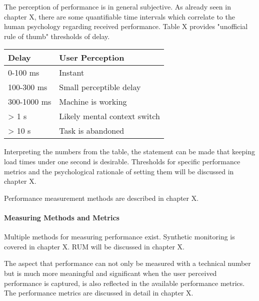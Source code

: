 The perception of performance is in general subjective.
As already seen in chapter X, there are some quantifiable time intervals which correlate to the human psychology regarding received performance.
Table X provides "unofficial rule of thumb" thresholds of delay. %

\begin{table}[h]
	\centering
	\begin{tabular}{| l | l | }
	\hline
	Delay & User Perception \\
	\hline
	0-100 ms & Instant \\
	100-300 ms & Small perceptible delay \\
	300-1000 ms & Machine is working \\
	> 1 s & Likely mental context switch \\
	> 10 s & Task is abandoned \\
	\hline
	\end{tabular}
\end{table}

Interpreting the numbers from the table, the statement can be made that keeping load times under one second is desirable.
Thresholds for specific performance metrics and the psychological rationale of setting them will be discussed in chapter X.

Performance measurement methods are described in chapter X.




\paragraph{Measuring Methods and Metrics}


Multiple methods for measuring performance exist.
Synthetic monitoring is covered in chapter X.
RUM will be discussed in chapter X.

The aspect that performance can not only be measured with a technical number but is much more meaningful and significant when the user perceived performance is captured, is also reflected in the available performance metrics.
The performance metrics are discussed in detail in chapter X.






